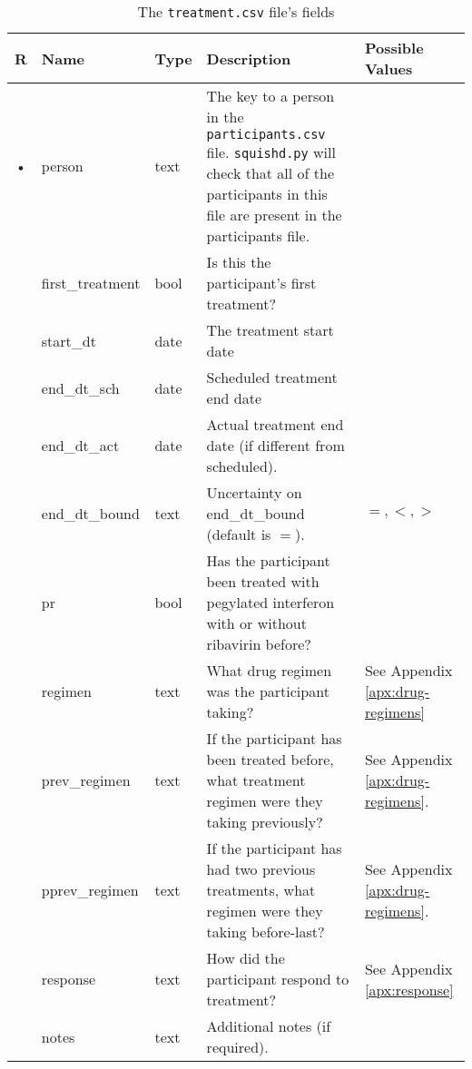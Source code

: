 \documentclass{article}
\begin{document}
\begin{table}[h!]
  \centering
  \caption{The \texttt{treatment.csv} file's fields}
  \label{tbl:treatment.csv}
  \begin{tabular}{cllp{6cm}p{4cm}}
    R & Name                & Type      & Description   & Possible Values\\ \hline
    • & person              & text    & The key to a person in the \texttt{participants.csv}
    file. \texttt{squishd.py} will check that all of the participants in this file
    are present in the participants file. & \\
      & first\_treatment    & bool      & Is this the participant's first treatment? & \\
      & start\_dt           & date      & The treatment start date & \\
      & end\_dt\_sch        & date      & Scheduled treatment end date & \\
      & end\_dt\_act        & date      & Actual treatment end date (if different from scheduled). \\
      & end\_dt\_bound      & text    &
    Uncertainty on end\_dt\_bound (default is $=$). & $=, <, >$ \\
      & pr                  & bool      & Has the participant been treated with pegylated interferon with or without ribavirin before? & \\
      & regimen             & text      & What drug regimen was the participant taking? & See Appendix \ref{apx:drug-regimens} \\
      & prev\_regimen       & text      & If the participant has been treated before, what treatment regimen were they taking previously?  & See Appendix \ref{apx:drug-regimens}. \\
      & pprev\_regimen      & text      & If the participant has had two previous treatments, what regimen were they taking before-last? & See Appendix \ref{apx:drug-regimens}. \\
      & response            & text      & How did the participant respond to treatment? & See Appendix \ref{apx:response} \\
      & notes               & text    & Additional notes (if required). & \\
  \end{tabular}
\end{table}
\end{document}
